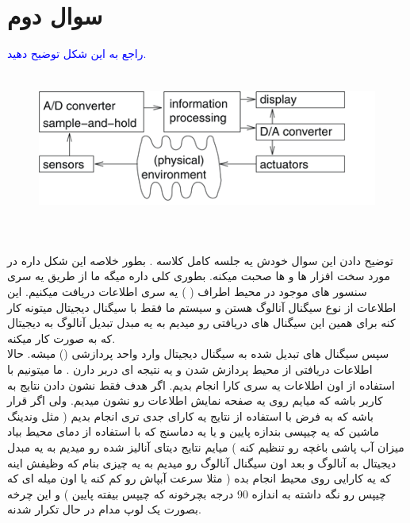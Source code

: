 \documentclass[12pt,a4paper]{article}							   %
\begin{document}
\section{سوال دوم }
	\begin{RTL}
			\textcolor{blue}{
راجع به این شکل توضیح دهید.  \\
			}
		\begin{figure}[h!]
		\centering
		\includegraphics*[height=5cm]{img1}
		\end{figure}
\\
توضیح دادن این سوال خودش یه جلسه کامل کلاسه
\smiley{}
. بطور خلاصه این شکل داره در مورد سخت افزار 
   ها و 
  ها صحبت میکنه. بطوری کلی داره میگه ما از طریق یه سری  سنسور های موجود در محیط اطراف
( )
  یه سری اطلاعات دریافت میکنیم. این اطلاعات از نوع سیگنال آنالوگ هستن و سیستم ما فقط با سیگنال دیجیتال میتونه کار کنه برای همین این سیگنال های دریافتی رو میدیم به یه مبدل تبدیل آنالوگ به دیجیتال که به صورت
   کار میکنه. \\
سپس سیگنال های تبدیل شده به سیگنال دیجیتال وارد واحد پردازشی
()
  میشه. حالا اطلاعات دریافتی از محیط پردازش شدن و یه نتیجه ای دربر دارن . ما میتونیم با استفاده از اون اطلاعات یه سری کارا انجام بدیم. اگر هدف فقط نشون دادن نتایج به کاربر باشه که میایم روی یه صفحه نمایش 
 اطلاعات رو نشون میدیم. ولی اگر قرار باشه که به فرض با استفاده از نتایج یه کارای جدی تری انجام بدیم ( مثل وندینگ ماشین که یه چیپسی بندازه پایین و یا یه دماسنج که با استفاده از دمای محیط بیاد میزان آب پاشی باغچه رو تنظیم کنه ) میایم نتایج دیتای آنالیز شده رو میدیم به یه مبدل دیجیتال به آنالوگ و بعد اون سیگنال آنالوگ رو میدیم به یه چیزی بنام
 که وظیفش اینه که یه کارایی روی محیط انجام بده ( مثلا سرعت آبپاش رو کم کنه یا اون میله ای که چیپس رو نگه داشته به اندازه 90 درجه بچرخونه که چیپس بیفته پایین ) و این چرخه بصورت یک لوپ مدام در حال تکرار شدنه.
	\end{RTL}
\newpage
\end{document}

